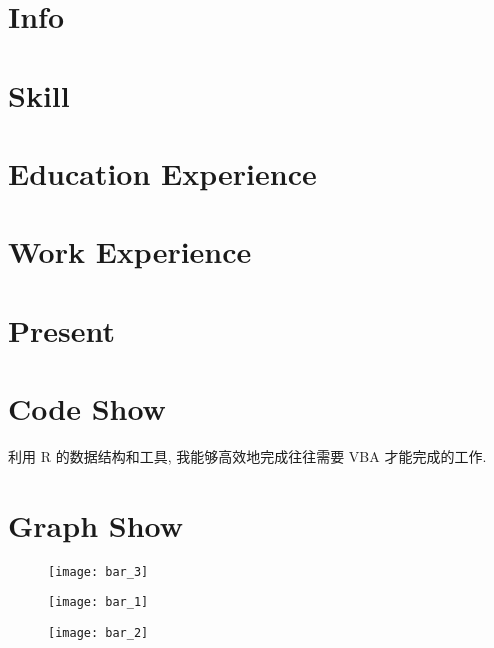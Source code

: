 \documentclass{article}
\begin{document}
	\section*{Info}
		
	\section*{Skill}
		
	\section*{Education Experience}
		
	\section*{Work Experience}
		
	\section*{Present}
		
	\section*{Code Show}
		利用 R 的数据结构和工具, 我能够高效地完成往往需要 VBA 才能完成的工作.
			
			
		
			
	\section*{Graph Show}
		\begin{figure}
		\begin{center}
		\texttt{[image: bar\_3]}
		\end{center}
		\end{figure}
		\begin{figure}
		\begin{center}
		\texttt{[image: bar\_1]}
		\end{center}
		\end{figure}
		\begin{figure}
		\begin{center}
		\texttt{[image: bar\_2]}
		\end{center}
		\end{figure}
\end{document}
